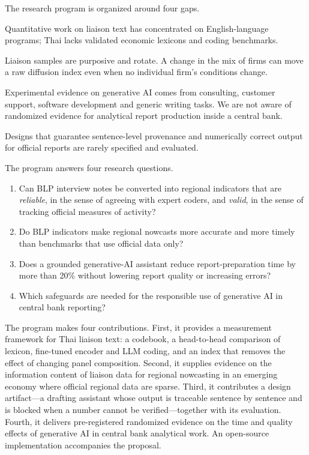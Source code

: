 \documentclass[11pt]{article}
\begin{document}
The research program is organized around four gaps.
\begin{description}[leftmargin=0pt,labelsep=0.5em]
\item[G1. Measurement in a low-resource language.] Quantitative work on liaison text has concentrated on English-language programs; Thai lacks validated economic lexicons and coding benchmarks.
\item[G2. Panel composition.] Liaison samples are purposive and rotate. A change in the mix of firms can move a raw diffusion index even when no individual firm's conditions change.
\item[G3. Causal evidence in central banking.] Experimental evidence on generative AI comes from consulting, customer support, software development and generic writing tasks. We are not aware of randomized evidence for analytical report production inside a central bank.
\item[G4. Auditable generation.] Designs that guarantee sentence-level provenance and numerically correct output for official reports are rarely specified and evaluated.
\end{description}

The program answers four research questions.
\begin{enumerate}[label=\textbf{RQ\arabic*.},leftmargin=3.2em]
\item Can BLP interview notes be converted into regional indicators that are \emph{reliable}, in the sense of agreeing with expert coders, and \emph{valid}, in the sense of tracking official measures of activity?
\item Do BLP indicators make regional nowcasts more accurate and more timely than benchmarks that use official data only?
\item Does a grounded generative-AI assistant reduce report-preparation time by more than 20\% without lowering report quality or increasing errors?
\item Which safeguards are needed for the responsible use of generative AI in central bank reporting?
\end{enumerate}

The program makes four contributions. First, it provides a measurement framework for Thai liaison text: a codebook, a head-to-head comparison of lexicon, fine-tuned encoder and LLM coding, and an index that removes the effect of changing panel composition. Second, it supplies evidence on the information content of liaison data for regional nowcasting in an emerging economy where official regional data are sparse. Third, it contributes a design artifact---a drafting assistant whose output is traceable sentence by sentence and is blocked when a number cannot be verified---together with its evaluation. Fourth, it delivers pre-registered randomized evidence on the time and quality effects of generative AI in central bank analytical work. An open-source implementation accompanies the proposal.
\end{document}
